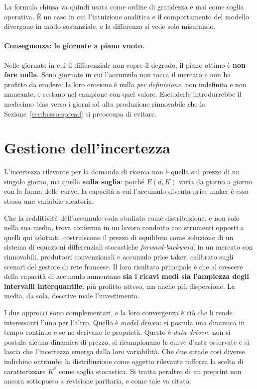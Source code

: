 La formula chiusa va quindi usata come ordine di grandezza e mai come soglia operativa. \`E un
caso in cui l'intuizione analitica e il comportamento del modello divergono in modo
sostanziale, e la differenza si vede solo misurando.

\paragraph{Conseguenza: le giornate a piano vuoto.} Nelle giornate in cui il differenziale non
copre il degrado, il piano ottimo \`e \textbf{non fare nulla}. Sono giornate in cui l'accumulo
non tocca il mercato e non ha profitto da erodere: la loro erosione \`e nulla \emph{per
definizione}, non indefinita e non mancante, e restano nel campione con quel valore.
Escluderle introdurrebbe il medesimo bias verso i giorni ad alta produzione rinnovabile che la
Sezione~\ref{sec:basso-spread} si preoccupa di evitare.

\section{Gestione dell'incertezza}
\label{sec:incertezza}

L'incertezza rilevante per la domanda di ricerca non \`e quella sul prezzo di un singolo
giorno, ma quella \textbf{sulla soglia}: poich\'e $E(d,K)$ varia da giorno a giorno con la
forma delle curve, la capacit\`a a cui l'accumulo diventa price maker \`e essa stessa una
variabile aleatoria.

Che la redditivit\`a dell'accumulo vada studiata come distribuzione, e non solo nella sua
media, trova conferma in un lavoro condotto con strumenti opposti a quelli qui adottati.
\textcite{dumitrescu2024impact} costruiscono il prezzo di equilibrio come soluzione di un
sistema di equazioni differenziali stocastiche \emph{forward-backward}, in un mercato con
rinnovabili, produttori convenzionali e accumulo price taker, calibrato sugli scenari del
gestore di rete francese. Il loro risultato principale \`e che al crescere della capacit\`a di
accumulo aumentano \textbf{sia i ricavi medi sia l'ampiezza degli intervalli
interquantile}: pi\`u profitto atteso, ma anche pi\`u dispersione. La media, da sola,
descrive male l'investimento.

I due approcci sono complementari, e la loro convergenza \`e ci\`o che li rende
interessanti l'uno per l'altro. Quello \`e \emph{model driven}: si postula una dinamica in
tempo continuo e se ne derivano le propriet\`a. Questo \`e \emph{data driven}: non si
postula alcuna dinamica di prezzo, si ricampionano le curve d'asta osservate e si lascia
che l'incertezza emerga dalla loro variabilit\`a. Che due strade cos\`i diverse indichino
entrambe la distribuzione come oggetto rilevante rafforza la scelta di caratterizzare
$K^*$ come soglia stocastica. Si tratta peraltro di un preprint non ancora sottoposto a
revisione paritaria, e come tale va citato.

